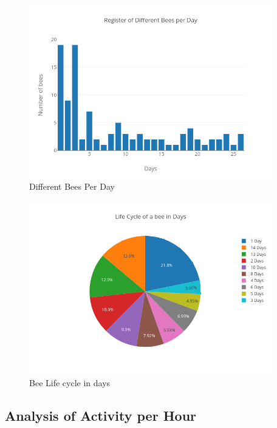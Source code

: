\documentclass[11pt,fleqn]{book} %
\begin{document}
\begin{figure}[h!]%
\centering%
\includegraphics[width=400px]{Pictures/plots/good/Morelia Hive 2differentBeesPerdayClean.png}%
\caption{Different Bees Per Day}%
\end{figure}

%


\begin{figure}[h!]%
\centering%
\includegraphics[width=400px]{Pictures/plots/good/Morelia Hive 2pieBeeLifeCycleClean.png}%
\caption{Bee Life cycle in days}%
\end{figure}

%
\subsection{Analysis of Activity per Hour}%
\label{subsec:Analysis of Activity per Hour}%
\end{document}

